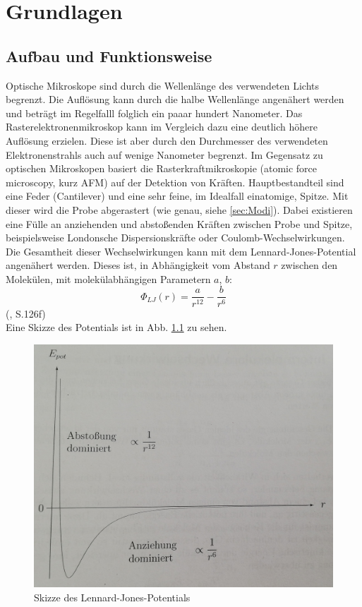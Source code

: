 
\chapter{Grundlagen}
\section{Aufbau und Funktionsweise}
Optische Mikroskope sind durch die Wellenlänge des verwendeten Lichts begrenzt. Die Auflösung kann durch die halbe Wellenlänge angenähert werden und beträgt im Regelfalll 
folglich ein paaar hundert Nanometer. Das Rasterelektronenmikroskop kann im Vergleich dazu eine deutlich höhere Auflösung erzielen. Diese ist aber durch 
den Durchmesser des verwendeten Elektronenstrahls auch auf wenige Nanometer begrenzt.
Im Gegensatz zu optischen Mikroskopen basiert die Rasterkraftmikroskopie (atomic force microscopy, kurz AFM) auf der Detektion von Kräften. 
Hauptbestandteil sind eine Feder (Cantilever) und eine sehr feine, im Idealfall einatomige, Spitze. Mit dieser wird die Probe abgerastert 
(wie genau, siehe \ref{sec:Modi}). Dabei existieren eine Fülle an anziehenden und abstoßenden Kräften zwischen Probe und Spitze, beispielsweise 
Londonsche Dispersionskräfte oder Coulomb-Wechselwirkungen. Die Gesamtheit dieser Wechselwirkungen kann mit dem Lennard-Jones-Potential 
angenähert werden. Dieses ist, in Abhängigkeit vom Abstand $r$ zwischen den Molekülen, mit molekülabhängigen Parametern $a$, $b$: 
\begin{equation*}
    \Phi_{LJ}(r) = \frac{a}{r^{12}} - \frac{b}{r^6}
\end{equation*}
(\cite{Demtroeder2013}, S.126f) \\
Eine Skizze des Potentials ist in Abb. \ref{bild:LJP} zu sehen.

\begin{figure}[h]
    \centering
    \includegraphics[scale = 0.135]{Bilder/LennardJones.jpg}
    \caption{Skizze des Lennard-Jones-Potentials \protect \footnotemark}
    \label{bild:LJP}
\end{figure}

